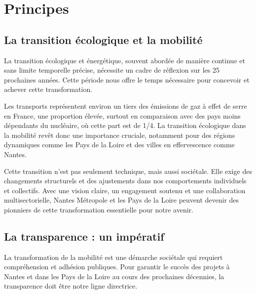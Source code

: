 \chapter{Principes}

\section{La transition écologique et la mobilité}

La transition écologique et énergétique, souvent abordée de manière
continue et sans limite temporelle précise, nécessite un cadre de
réflexion sur les 25 prochaines années. Cette période nous offre le
temps nécessaire pour concevoir et achever cette transformation.

Les transports représentent environ un tiers des émissions de gaz à
effet de serre en France, une proportion élevée, surtout en
comparaison avec des pays moins dépendants du nucléaire, où cette part
est de 1/4. La transition écologique dans la mobilité revêt donc une
importance cruciale, notamment pour des régions dynamiques comme les
Pays de la Loire et des villes en effervescence comme Nantes.

Cette transition n'est pas seulement technique, mais aussi
sociétale. Elle exige des changements structurels et des ajustements
dans nos comportements individuels et collectifs. Avec une vision
claire, un engagement soutenu et une collaboration multisectorielle,
Nantes Métropole et les Pays de la Loire peuvent devenir des pionniers
de cette transformation essentielle pour notre avenir.


\section{La transparence : un impératif}

La transformation de la mobilité est une démarche sociétale qui
requiert compréhension et adhésion publiques. Pour garantir le succès
des projets à Nantes et dans les Pays de la Loire au cours des
prochaines décennies, la transparence doit être notre ligne
directrice.

